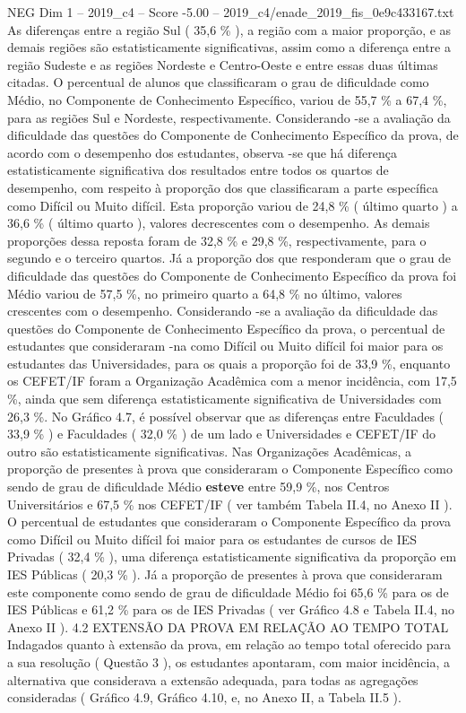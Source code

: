\begin{textsample}{NEG Dim 1 – 2019\_c4 – Score -5.00 – 2019\_c4/enade\_2019\_fis\_0e9c433167.txt}
As diferenças entre a região Sul ( 35,6 \% ), a região com a maior proporção, e as demais regiões são estatisticamente significativas, assim como a diferença entre a região Sudeste e as regiões Nordeste e Centro-Oeste e entre essas duas últimas citadas.
O percentual de alunos que classificaram o grau de dificuldade como Médio, no Componente de Conhecimento Específico, variou de 55,7 \% a 67,4 \%, para as regiões Sul e Nordeste, respectivamente.
Considerando -se a avaliação da dificuldade das questões do Componente de Conhecimento Específico da prova, de acordo com o desempenho dos estudantes, observa -se que há diferença estatisticamente significativa dos resultados entre todos os quartos de desempenho, com respeito à proporção dos que classificaram a parte específica como Difícil ou Muito difícil.
Esta proporção variou de 24,8 \% ( último quarto ) a 36,6 \% ( último quarto ), valores decrescentes com o desempenho.
As demais proporções dessa reposta foram de 32,8 \% e 29,8 \%, respectivamente, para o segundo e o terceiro quartos.
Já a proporção dos que responderam que o grau de dificuldade das questões do Componente de Conhecimento Específico da prova foi Médio variou de 57,5 \%, no primeiro quarto a 64,8 \% no último, valores crescentes com o desempenho.
Considerando -se a avaliação da dificuldade das questões do Componente de Conhecimento Específico da prova, o percentual de estudantes que consideraram -na como Difícil ou Muito difícil foi maior para os estudantes das Universidades, para os quais a proporção foi de 33,9 \%, enquanto os CEFET/IF foram a Organização Acadêmica com a menor incidência, com 17,5 \%, ainda que sem diferença estatisticamente significativa de Universidades com 26,3 \%.
No Gráfico 4.7, é possível observar que as diferenças entre Faculdades ( 33,9 \% ) e Faculdades ( 32,0 \% ) de um lado e Universidades e CEFET/IF do outro são estatisticamente significativas.
Nas Organizações Acadêmicas, a proporção de presentes à prova que consideraram o Componente Específico como sendo de grau de dificuldade Médio \textbf{esteve} entre 59,9 \%, nos Centros Universitários e 67,5 \% nos CEFET/IF ( ver também Tabela II.4, no Anexo II ).
O percentual de estudantes que consideraram o Componente Específico da prova como Difícil ou Muito difícil foi maior para os estudantes de cursos de IES Privadas ( 32,4 \% ), uma diferença estatisticamente significativa da proporção em IES Públicas ( 20,3 \% ).
Já a proporção de presentes à prova que consideraram este componente como sendo de grau de dificuldade Médio foi 65,6 \% para os de IES Públicas e 61,2 \% para os de IES Privadas ( ver Gráfico 4.8 e Tabela II.4, no Anexo II ). 4.2 EXTENSÃO DA PROVA EM RELAÇÃO AO TEMPO TOTAL Indagados quanto à extensão da prova, em relação ao tempo total oferecido para a sua resolução ( Questão 3 ), os estudantes apontaram, com maior incidência, a alternativa que considerava a extensão adequada, para todas as agregações consideradas ( Gráfico 4.9, Gráfico 4.10, e, no Anexo II, a Tabela II.5 ).

\end{textsample}
